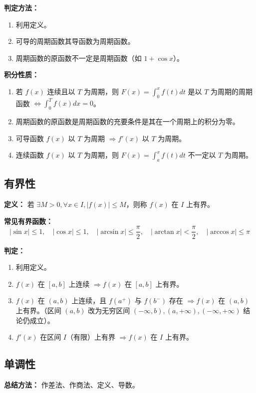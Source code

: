 \documentclass[a4paper,12pt]{ctexart}
\newenvironment{purplebox}
  {\begin{tcolorbox}[colback=white, colframe=boxpurple, boxrule=1pt, sharp corners, title=\textbf{定义/定理/核心公式}]}
  {\end{tcolorbox}}
\newcommand{\zh}[1]{\par\smallskip\noindent\textbf{#1}\par\smallskip}
\begin{document}
\textbf{判定方法：}
\begin{enumerate}
    \item 利用定义。
    \item 可导的周期函数其导函数为周期函数。
    \item 周期函数的原函数不一定是周期函数（如 $1 + \cos x$）。
\end{enumerate}

\zh{积分性质：}
\begin{enumerate}
    \item 若 $f(x)$ 连续且以 $T$ 为周期，则
    $F(x) = \int_0^x f(t) dt$ 是以 $T$ 为周期的周期函数 $\Leftrightarrow \int_0^T f(x) dx = 0$。
    \item 周期函数的原函数是周期函数的充要条件是其在一个周期上的积分为零。
    \item 可导函数 $f(x)$ 以 $T$ 为周期 $\Rightarrow f'(x)$ 以 $T$ 为周期。
    \item 连续函数 $f(x)$ 以 $T$ 为周期，则 $F(x) = \int_a^x f(t) dt$ 不一定以 $T$ 为周期。
\end{enumerate}

\subsection{有界性}
\begin{purplebox}
    \textbf{定义：} 若 $\exists M > 0, \forall x \in I, |f(x)| \leqslant M$，则称 $f(x)$ 在 $I$ 上有界。
\end{purplebox}

\textbf{常见有界函数：}
\[ |\sin x| \leqslant 1, \quad |\cos x| \leqslant 1, \quad |\arcsin x| \leqslant \frac{\pi}{2}, \quad |\arctan x| < \frac{\pi}{2}, \quad |\arccos x| \leqslant \pi \]

\textbf{判定：}
\begin{enumerate}
    \item 利用定义。
    \item $f(x)$ 在 $[a, b]$ 上连续 $\Rightarrow f(x)$ 在 $[a, b]$ 上有界。
    \item $f(x)$ 在 $(a, b)$ 上连续，且 $f(a^+)$ 与 $f(b^-)$ 存在 $\Rightarrow f(x)$ 在 $(a, b)$ 上有界。（区间 $(a, b)$ 改为无穷区间 $(-\infty, b), (a, +\infty), (-\infty, +\infty)$ 结论仍成立）。
    \item $f'(x)$ 在区间 $I$（有限）上有界 $\Rightarrow f(x)$ 在 $I$ 上有界。
\end{enumerate}

\subsection{单调性}
\textbf{总结方法：} 作差法、作商法、定义、导数。
\end{document}
